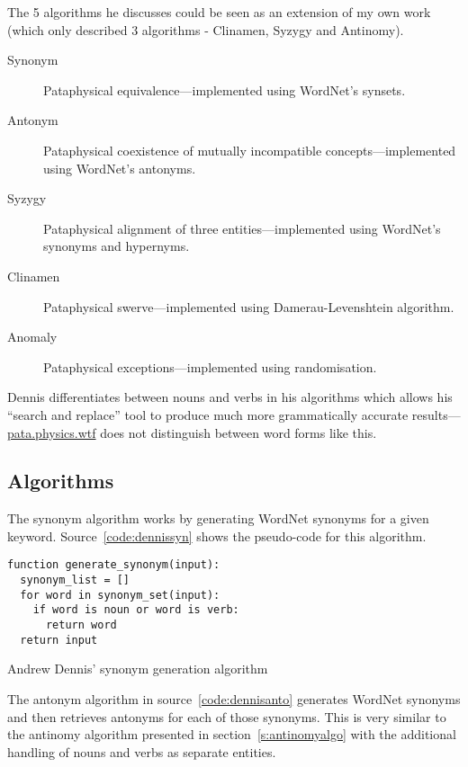 The 5 algorithms he discusses could be seen as an extension of my own work (which only described 3 algorithms - Clinamen, Syzygy and Antinomy). 

\begin{description}
  \item[Synonym] Pataphysical equivalence---implemented using WordNet's synsets.
  \item[Antonym] Pataphysical coexistence of mutually incompatible concepts---implemented using WordNet's antonyms.
  \item[Syzygy] Pataphysical alignment of three entities---implemented using WordNet's synonyms and hypernyms.
  \item[Clinamen] Pataphysical swerve---implemented using Damerau-Levenshtein algorithm.
  \item[Anomaly] Pataphysical exceptions---implemented using randomisation.
\end{description}

Dennis differentiates between nouns and verbs in his algorithms which allows his ``search and replace'' tool to produce much more grammatically accurate results---\url{pata.physics.wtf} does not distinguish between word forms like this.


\subsection{Algorithms}

The synonym algorithm works by generating WordNet synonyms for a given keyword. Source~\ref{code:dennissyn} shows the pseudo-code for this algorithm.

\begin{listing}[!htbp] %
  \begin{verbatim}
function generate_synonym(input):
  synonym_list = []
  for word in synonym_set(input):
    if word is noun or word is verb:
      return word
  return input
  \end{verbatim}
\caption[Dennis' synonym generation]{Andrew Dennis' synonym generation algorithm}
\label{code:dennissyn}
\end{listing}

The antonym algorithm in source~\ref{code:dennisanto} generates WordNet synonyms and then retrieves antonyms for each of those synonyms. This is very similar to the antinomy algorithm presented in section~\ref{s:antinomyalgo} with the additional handling of nouns and verbs as separate entities.

